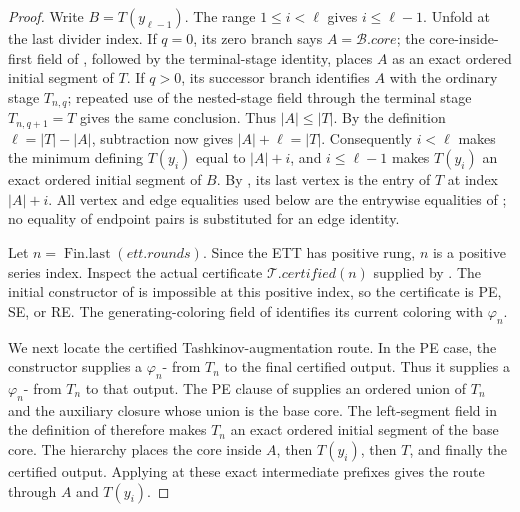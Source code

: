 \begin{proof}
Write $B=T(y_{\ell-1})$.  The range $1\leq i<\ell$ gives
$i\leq\ell-1$.  Unfold  at the last
divider index.  If $q=0$, its zero branch says
$A=\mathcal B.\mathit{core}$; the core-inside-first field of
, followed by the terminal-stage identity,
places $A$ as an exact ordered initial segment of $T$.  If $q>0$, its
successor branch identifies $A$ with the ordinary stage $T_{n,q}$;
repeated use of the nested-stage field through the terminal stage
$T_{n,q+1}=T$ gives the same conclusion.  Thus $|A|\leq |T|$.  By the
definition $\ell=|T|-|A|$, subtraction now gives $|A|+\ell=|T|$.
Consequently $i<\ell$ makes the minimum defining $T(y_i)$ equal to
$|A|+i$, and $i\leq\ell-1$ makes $T(y_i)$ an exact ordered initial
segment of $B$.
By , its last vertex is the entry of $T$ at
index $|A|+i$.  All vertex and edge equalities used below are the
entrywise equalities of ; no equality
of endpoint pairs is substituted for an edge identity.

Let $n=\operatorname{Fin.last}(\mathit{ett.rounds})$.  Since the ETT has
positive rung, $n$ is a positive series index.  Inspect the actual
certificate $\mathcal T.\mathit{certified}(n)$ supplied by
.  The initial constructor of
 is impossible at this positive index, so
the certificate is PE, SE, or RE.  The generating-coloring field of
 identifies its current coloring with
$\varphi_n$.

We next locate the certified Tashkinov-augmentation route.  In the PE
case, the constructor supplies a
$\varphi_n$- from $T_n$ to the final certified
output.  Thus it supplies a
$\varphi_n$- from $T_n$ to that
output.  The PE clause of  supplies an ordered
union of $T_n$ and the auxiliary closure whose union is the base core.
The left-segment field in the definition of 
therefore makes $T_n$ an exact ordered initial segment of the base core.
The hierarchy places the core inside $A$, then $T(y_i)$, then $T$, and
finally the certified output.  Applying
 at these exact intermediate
prefixes gives the route through $A$ and $T(y_i)$.


\end{proof}
